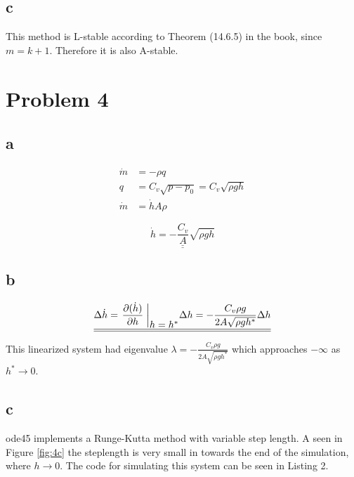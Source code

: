 \documentclass{article}
\begin{document}
\subsection{c}

This method is L-stable according to Theorem (14.6.5) in the book, since $m=k+1$. Therefore it is also A-stable.

\section{Problem 4}
\subsection{a}

\begin{align*}
    \dot m &= -\rho q\\
    q &= C_v\sqrt{p-p_0} = C_v\sqrt{\rho g h}\\
    \dot m &= \dot h A\rho
\end{align*}

\begin{equation}\label{eq:tank}
    \underline{\underline{\dot h = -\frac{C_v}{A}\sqrt{\rho g h}}}
\end{equation}

\subsection{b}

\begin{equation*}
    \underline{\underline{\Delta \dot h = \left. \frac{\partial (\dot h)}{\partial h} \right.\bigg|_{\shortstack{$h = h^*$}} \Delta h
    = -\frac{C_v\rho g}{2A\sqrt{\rho g h^*}}\Delta h}}
\end{equation*}

This linearized system had eigenvalue $\lambda = -\frac{C_v\rho g}{2A\sqrt{\rho g h^*}}$ which approaches $-\infty$ as $h^* \rightarrow 0$.

\subsection{c}

ode45 implements a Runge-Kutta method with variable step length. A seen in Figure \ref{fig:4c} the steplength is very small in towards the end of the simulation, where $h \rightarrow 0$. The code for simulating this system can be seen in Listing 2.
\end{document}
